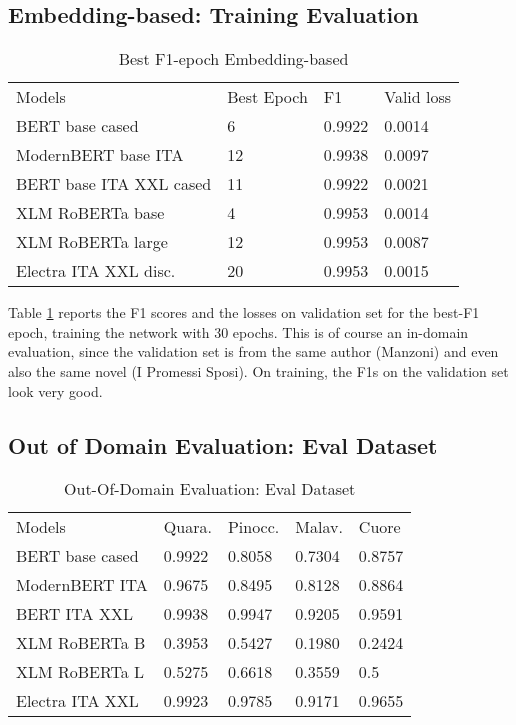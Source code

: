 \documentclass[11pt]{article}
\begin{document}
\subsection{Embedding-based: Training Evaluation}

\begin{table}[]
	\small
	\caption{Best F1-epoch Embedding-based}
	\begin{tabular}{llll}
		Models & Best Epoch & F1 & Valid loss \\
		BERT base cased & 6      & 0.9922        & 0.0014                  \\
		ModernBERT base ITA  & 12      & 0.9938        & 0.0097                  \\
		BERT base ITA XXL cased & 11      & 0.9922        & 0.0021                 \\
		XLM RoBERTa base & 4       & 0.9953        & 0.0014                  \\
		XLM RoBERTa large & 12       & 0.9953       & 0.0087                 \\
		Electra ITA XXL disc. & 20       & 0.9953        & 0.0015                
	\end{tabular}
	\label{t1}
\end{table}

Table \ref{t1} reports the F1 scores and the losses on validation set 
for the best-F1 epoch, training the network with 30 epochs.
This is of course an in-domain evaluation, since the validation set
is from the same author (Manzoni) and even also the same novel
(I Promessi Sposi).
On training, the F1s on the validation set look very good.

\subsection{Out of Domain Evaluation: Eval Dataset}

\begin{table}[]
	\small
	\caption{Out-Of-Domain Evaluation: Eval Dataset}
	\begin{tabular}{lllll}
		Models & Quara. & Pinocc. & Malav. & Cuore \\
		BERT base cased & 0.9922      & 0.8058 & 0.7304        & 0.8757                  \\
		ModernBERT ITA  & 0.9675     & 0.8495   & 0.8128   & 0.8864                  \\
		BERT ITA XXL  & 0.9938      & 0.9947   & 0.9205     & 0.9591                 \\
		XLM RoBERTa B & 0.3953       & 0.5427   & 0.1980     & 0.2424                 \\
		XLM RoBERTa L & 0.5275       & 0.6618    & 0.3559   & 0.5               \\
		Electra ITA XXL  & 0.9923       & 0.9785    & 0.9171    & 0.9655             
	\end{tabular}
	\label{t2}
\end{table}
\end{document}
